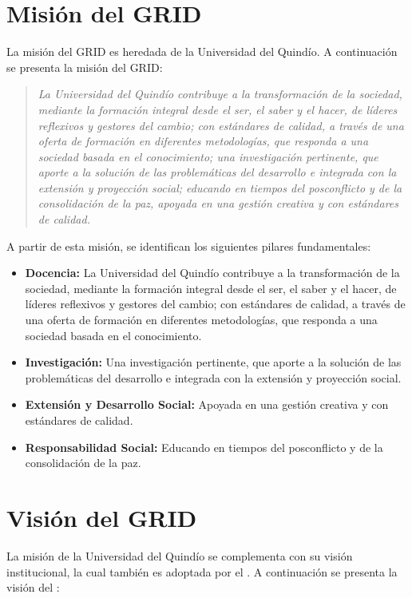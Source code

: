 \section{Misión del GRID}
La misión del GRID es heredada de la Universidad del Quindío. A continuación se presenta la misión del GRID:\@

\begin{quote}
	\textit{La Universidad del Quindío contribuye a la transformación de la sociedad, mediante la formación integral desde el ser, el saber y el hacer, de líderes reflexivos y gestores del cambio; con estándares de calidad, a través de una oferta de formación en diferentes metodologías, que responda a una sociedad basada en el conocimiento; una investigación pertinente, que aporte a la solución de las problemáticas del desarrollo e integrada con la extensión y proyección social; educando en tiempos del posconflicto y de la consolidación de la paz, apoyada en una gestión creativa y con estándares de calidad.}
\end{quote}

A partir de esta misión, se identifican los siguientes pilares fundamentales:

\begin{itemize}
	\item \textbf{Docencia:} La Universidad del Quindío contribuye a la transformación de la sociedad, mediante la formación integral desde el ser, el saber y el hacer, de líderes reflexivos y gestores del cambio; con estándares de calidad, a través de una oferta de formación en diferentes metodologías, que responda a una sociedad basada en el conocimiento.

	\item \textbf{Investigación:} Una investigación pertinente, que aporte a la solución de las problemáticas del desarrollo e integrada con la extensión y proyección social.

	\item \textbf{Extensión y Desarrollo Social:} Apoyada en una gestión creativa y con estándares de calidad.

	\item \textbf{Responsabilidad Social:} Educando en tiempos del posconflicto y de la consolidación de la paz.
\end{itemize}

\section{Visión del GRID}
La misión de la Universidad del Quindío se complementa con su visión institucional, la cual también es adoptada por el \GRID. A continuación se presenta la visión del \GRID:\@

